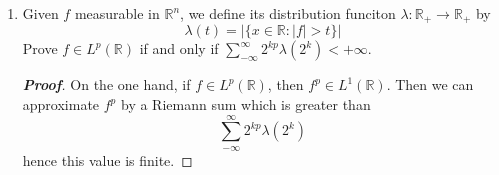 \documentclass[12pt,leqno]{book}
\theoremstyle{definition}
\newcommand{\R}{\mathbb{R}}
\newenvironment{Proof}{\begin{proof}[\textnormal{\textbf{Proof}}]}{\end{proof}}
\begin{document}
\begin{enumerate}
\begin{Proof}
\begin{enumerate}
  \item We first observe that \[\lim_{n\to\infty}\int_I\cos(nx)dx=0\] for any compact interval $I$. Further, for any step function $f(x)=\lambda\chi_I$, \[\lim_{n\to\infty}\int_{\R}f(x)\cos(nx)dx=\lambda\lim_{n\to\infty}\int_I\cos(nx)dx=0\] For any positive function $f$, we have $f_k\to f$ with $f_k$ a sequence of step functions and, by dominated convergence, \begin{align*}\lim_{n\to\infty}\int_{\R}f(x)\cos(nx)dx&=\lim_{n\to\infty}\lim_{k\to\infty}\int_{\R}f_k(x)\cos(nx)dx\\&=\lim_{k\to\infty}\lim_{n\to\infty}\int_{\R}f_k(x)\cos(nx)dx\\&=0\end{align*} Then, for any measurable function $f$, write $f=g-h$ with $g,h$ positive $L_1$ functions. Then \begin{align*}\lim_{n\to\infty}\int_{\R}f(x)\cos(nx)dx&=\lim_{n\to\infty}\int_{\R}g(x)\cos(nx)dx-\lim_{n\to\infty}\int_{\R}h(x)\cos(nx)dx\\&=0\end{align*} which completes the proof.

  \item Recall that \[\cos^2(\theta)=\frac{1+\cos2\theta}{2}\] and so \begin{align*}\int_E\cos^2(nx+u_n)dx&=\frac{1}{2}\int_E1dx+\frac{1}{2}\int_E\cos2\left(nx+u_n\right)dx\\&=\frac{1}{2}|E|+\frac{1}{2}\cos2u_n\int_E\cos2nxdx-\frac{1}{2}\sin2u_n\int_E\sin2nxdx\end{align*} By the Riemann-Lebesgue Lemma, \begin{align*}\int_E\cos2nxdx&=\int_{-\infty}^{\infty}\chi_E(x)\cos2nxdx\to0\text{ as }n\to\infty\\\int_E\sin2nxdx&=\int_{-\infty}^{\infty}\chi_E(x)\sin2nxdx\to0\text{ as }n\to\infty\end{align*} hence \[\int_E\cos^2(nx+u_n)dx\to\frac{1}{2}|E|\text{ as }n\to\infty\qedhere\]

\end{enumerate}
\end{Proof}

 \item Given $f$ measurable in $\R^n$, we define its distribution funciton $\lambda:\R_+\to\R_+$ by \[\lambda(t)=|\{x\in\R:|f|>t\}|\] Prove $f\in L^p(\R)$ if and only if $\displaystyle\sum_{-\infty}^{\infty}2^{kp}\lambda(2^k)<+\infty$.

\begin{Proof}
 On the one hand, if $f\in L^p(\R)$, then $f^p\in L^1(\R)$. Then we can approximate $f^p$ by a Riemann sum which is greater than \[\sum_{-\infty}^{\infty}2^{kp}\lambda(2^k)\] hence this value is finite.


\end{Proof}
\end{enumerate}
\end{document}
